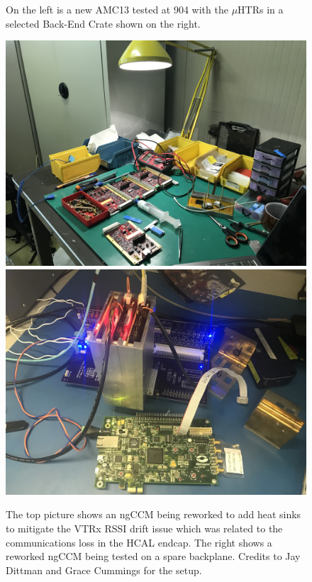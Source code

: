\begin{figure}[!htb]
	\caption{On the left is a new AMC13 tested at 904 with the $\mu$HTRs in a selected Back-End Crate shown on the right.}
	\label{fig:BackendCrate904}
\end{figure}

\begin{figure}[!htb]
	\centering
	\includegraphics[scale=0.08]{fig/coolingfins.jpg}
     \includegraphics[scale=0.08]{fig/testing.jpg}
	\caption{The top picture shows an ngCCM being reworked to add heat sinks to mitigate the VTRx RSSI drift issue which was related to the communications loss in the HCAL endcap. The right shows a reworked ngCCM being tested on a spare backplane. Credits to Jay Dittman and Grace Cummings for the setup.}
	\label{fig:BackendCrate904}
\end{figure}

